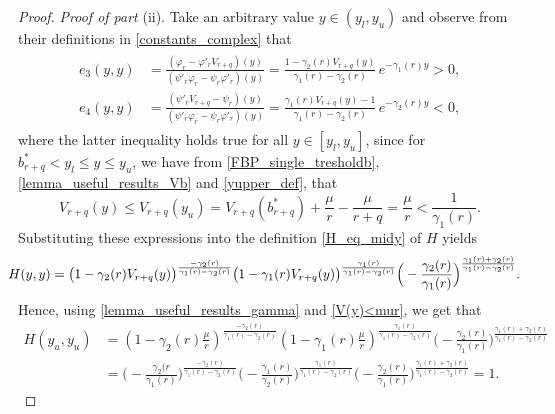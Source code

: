 \documentclass[11pt]{article} %
\renewcommand{\phi}{\varphi}
\numberwithin{komcounter}{section}
\numberwithin{equation}{section}
\numberwithin{theorem}{section}
\begin{document}
\begin{proof}
\vspace{1mm} 
{\it Proof of part} (ii). 
Take an arbitrary value $y \in (y_l,y_u)$ and observe from their definitions in \eqref{constants_complex} that 
\begin{align} \label{c_3c_4yy}
\begin{split}
e_3(y,y) 
&= \frac{(\phi_{r}-\phi'_{r}V_{r+q})(y)}{(\psi'_{r}\phi_{r}-\psi_{r}\phi'_{r})(y)} 
= \frac{1-\gamma_2(r)V_{r+q}(y)}{\gamma_1(r)-\gamma_2(r)} \, e^{-\gamma_1(r)y} > 0,\\ 
e_4(y,y)
&= \frac{(\psi'_{r}V_{r+q}-\psi_{r})(y)}{(\psi'_{r}\phi_{r}-\psi_{r}\phi'_{r})(y)} = \frac{\gamma_1(r)V_{r+q}(y)-1}{\gamma_1(r)-\gamma_2(r)} \, e^{-\gamma_2(r)y} < 0 ,
\end{split}
\end{align}
where the latter inequality holds true for all $y \in [y_l,y_u]$, since for $b^*_{r+q} < y_l \leq y \leq y_u$, we have from \eqref{FBP_single_tresholdb}, \eqref{lemma_useful_results_Vb} and \eqref{yupper_def}, that 
\begin{equation} \label{V(y)<mur}
V_{r+q}(y) \leq V_{r+q}(y_u) 
= V_{r+q}(b^*_{r+q}) + \frac{\mu}r - \frac{\mu}{r+q} 
= \frac{\mu}r < \frac{1}{\gamma_1(r)} . \end{equation}
Substituting these expressions into the definition \eqref{H_eq_midy} of $H$ yields 
\begin{align} \label{hyy}
\hspace{-3mm}
H(y,y) 
= \big( 1-\gamma_2(r)V_{r+q}(y) \big)^{\frac{-\gamma_2(r)}{\gamma_1(r)-\gamma_2(r)}} \big(1-\gamma_1(r)V_{r+q}(y) \big)^{\frac{\gamma_1(r)}{\gamma_1(r)-\gamma_2(r)}} \Big( -\frac{\gamma_2(r)}{\gamma_1(r)} \Big)^{\frac{\gamma_1(r)+\gamma_2(r)}{\gamma_1(r)-\gamma_2(r)}}.
\end{align}
Hence, using \eqref{lemma_useful_results_gamma} and \eqref{V(y)<mur}, we get that 
\begin{align*}
H(y_u,y_u) 
&= \left(1-\gamma_2(r)\frac{\mu}{r}\right)^{\frac{-\gamma_2(r)}{\gamma_1(r)-\gamma_2(r)}} \left(1-\gamma_1(r)\frac{\mu}{r}\right)^{\frac{\gamma_1(r)}{\gamma_1(r)-\gamma_2(r)}} \Big(-\frac{\gamma_2(r)}{\gamma_1(r)}\Big)^{\frac{\gamma_1(r)+\gamma_2(r)}{\gamma_1(r)-\gamma_2(r)}}\\
&= \Big(-\frac{\gamma_2(r}{\gamma_1(r)}\Big)^{\frac{-\gamma_2(r)}{\gamma_1(r)-\gamma_2(r)}} \Big(-\frac{\gamma_1(r)}{\gamma_2(r)}\Big)^{\frac{\gamma_1(r)}{\gamma_1(r)-\gamma_2(r)}} \Big(-\frac{\gamma_2(r)}{\gamma_1(r)}\Big)^{\frac{\gamma_1(r)+\gamma_2(r)}{\gamma_1(r)-\gamma_2(r)}} 
= 1.
\end{align*}


\end{proof}
\end{document}
